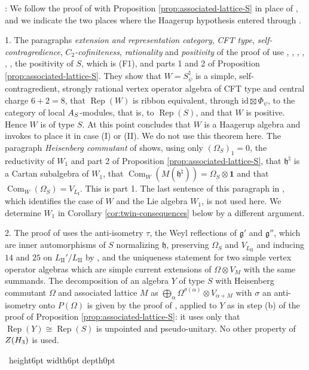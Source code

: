 \documentclass[leqno]{article}
\let\cal\relax
\newcommand{\cal}{\mathcal}
\newcommand{\qed}{\hfill \vrule height6pt  width6pt depth0pt}
\newcommand{\ot}{\otimes}
\DeclareMathOperator{\Rep}{Rep}
\newenvironment{proof}[1][]{\noindent {\it Proof #1} : }{\hbox{~}\qed
\smallskip
}
\numberwithin{equation}{section}
\begin{document}
\begin{proof}
We follow the proof of \cite[Theorem 12.3]{Arh26} with Proposition \ref{prop:associated-lattice-S} in place of \cite[Proposition 12.2]{Arh26}, and we indicate the two places where the Haagerup hypothesis entered through \cite[Theorem 8.5]{Arh26}.

1. The paragraphs \emph{extension and representation category}, \emph{CFT type}, \emph{self-contragredience}, \emph{$C_2$-cofiniteness}, \emph{rationality} and \emph{positivity} of the proof of \cite[Theorem 12.3]{Arh26} use \cite[Theorem 3.2 and Remark 3.3]{HKL15}, \cite{CKM22}, \cite{DMNO13}, \cite{Li94}, \cite{Buh02}, \cite{ABD04}, the positivity of $S$, which is (F1), and parts 1 and 2 of Proposition \ref{prop:associated-lattice-S}. They show that $W = S^\natural_\psi$ is a simple, self-contragredient, strongly rational vertex operator algebra of CFT type and central charge $6+2 = 8$, that $\Rep(W)$ is ribbon equivalent, through $\mathrm{id} \boxtimes \Phi_\psi$, to the category of local $\cal A_S$-modules, that is, to $\Rep(S)$, and that $W$ is positive. Hence $W$ is of type $S$. At this point \cite{Arh26} concludes that $W$ is a Haagerup algebra and invokes \cite[Theorem 8.5]{Arh26} to place it in case (I) or (II). We do not use this theorem here. The paragraph \emph{Heisenberg commutant} of \cite{Arh26} shows, using only $(\Omega_S)_1 = 0$, the reductivity of $W_1$ \cite[Theorem 1]{DoM04} and part 2 of Proposition \ref{prop:associated-lattice-S}, that $\mathfrak h^\natural$ is a Cartan subalgebra of $W_1$, that $\operatorname{Com}_W(M(\mathfrak h^\natural)) = \Omega_S \ot \mathbf 1$ and that $\operatorname{Com}_W(\Omega_S) = V_{L_{\mathrm I}}$. This is part 1. The last sentence of this paragraph in \cite{Arh26}, which identifies the case of $W$ and the Lie algebra $W_1$, is not used here. We determine $W_1$ in Corollary \ref{cor:twin-consequences} below by a different argument.

2. The proof of \cite[Theorem 12.3(2)]{Arh26} uses the anti-isometry $\tau$, the Weyl reflections of $\mathfrak g'$ and $\mathfrak g''$, which are inner automorphisms of $S$ normalizing $\mathfrak h$, preserving $\Omega_S$ and $V_{L_{\mathrm{II}}}$ and inducing $14$ and $25$ on $L_{\mathrm{II}}'/L_{\mathrm{II}}$ by \cite[Lemma 12.1(4)]{Arh26}, and the uniqueness statement \cite[Proposition 5.3]{DoM04} for two simple vertex operator algebras which are simple current extensions of $\Omega \ot V_M$ with the same summands. The decomposition of an algebra $Y$ of type $S$ with Heisenberg commutant $\Omega$ and associated lattice $M$ as $\bigoplus_\alpha \Omega^{\sigma(\alpha)} \ot V_{\alpha+M}$ with $\sigma$ an anti-isometry onto $P(\Omega)$ is given by the proof of \cite[Corollary 4.10]{MoR24a}, applied to $Y$ as in step (b) of the proof of Proposition \ref{prop:associated-lattice-S}: it uses only that $\Rep(Y) \cong \Rep(S)$ is unpointed and pseudo-unitary. No other property of $Z(\cal H_3)$ is used.


\end{proof}
\end{document}
